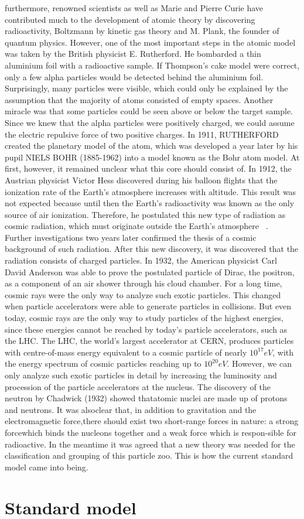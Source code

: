 furthermore, renowned scientists as well as Marie and Pierre Curie have contributed much to the development of atomic theory by discovering radioactivity, Boltzmann by kinetic gas theory and M. Plank, the founder of quantum physics.
However, one of the most important steps in the atomic model was taken by the British physicist E. Rutherford. He bombarded a thin aluminium foil with a radioactive sample. If Thompson's cake model were correct, only a few alpha particles would be detected behind the aluminium foil. Surprisingly, many particles were visible, which could only be explained by the assumption that the majority of atoms consisted of empty spaces. Another miracle was that some particles could be seen above or below the target sample. Since we knew that the alpha particles were positively charged, we could assume the electric repulsive force of two positive charges. In 1911, RUTHERFORD created the planetary model of the atom, which was developed a year later by his pupil NIELS BOHR (1885-1962) into a model known as the Bohr atom model.
At first, however, it remained unclear what this core should consist of.    
In 1912, the Austrian physicist Victor Hess discovered during his balloon flights that the ionization rate of the Earth's atmosphere increases with altitude. This result was not expected because until then the Earth's radioactivity was known as the only source of air ionization. Therefore, he postulated this new type of radiation as cosmic radiation, which must originate outside the Earth's atmosphere ~\cite{Ender}.\\
Further investigations two years later confirmed the thesis of a cosmic background of such radiation. After this new discovery, it was discovered that the radiation consists of charged particles. In 1932, the American physicist Carl David Anderson was able to prove the postulated particle of Dirac, the positron, as a component of an air shower through his cloud chamber. For a long time, cosmic rays were the only way to analyze such exotic particles.
This changed when particle accelerators were able to generate particles in collisions. But even today, cosmic rays are the only way to study particles of the highest energies, since these energies cannot be reached by today's particle accelerators, such as the LHC. The LHC, the world's largest accelerator at CERN, produces particles with centre-of-mass energy equivalent to a cosmic particle of nearly $10^{17} eV $, with the energy spectrum of cosmic particles reaching up to $10^{20} eV $.
However, we can only analyze such exotic particles in detail by increasing the luminosity and procession of the particle accelerators at the nucleus. 
The discovery of the neutron by Chadwick (1932) showed thatatomic nuclei are made up of protons and neutrons. It was alsoclear that, in addition to gravitation and the electromagnetic force,there should exist two short-range forces in nature: a strong forcewhich binds the nucleons together and a weak force which is respon-sible for radioactive.
In the meantime it was agreed that a new theory was needed for the classification and grouping of this particle zoo. This is how the current standard model came into being.

\section{Standard model}